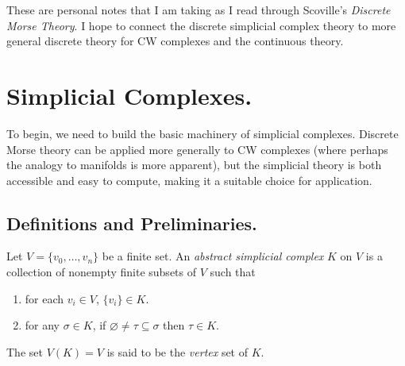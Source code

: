 
\usepackage{csquotes}
\usepackage[style=verbose-ibid,backend=bibtex]{biblatex}


\usepackage{scalerel,stmaryrd}
\newsavebox\wedgearrowbaseline
\savebox\wedgearrowbaseline{$\scalerel{%
    \ooalign{/\cr/}\mkern-8.5mu}{\ssearrow}$}
\newcommand{\wedgearrow}{\mathrel{\scalerel*{%
    \usebox{\wedgearrowbaseline}}{X}}} %

\rhead{\today}



These are personal notes that I am taking as I read through Scoville's \textit{Discrete Morse Theory}\autocite{dmt}.
I hope to connect the discrete simplicial complex theory to more general discrete theory for CW complexes and the
continuous theory.

\section{Simplicial Complexes.}

To begin, we need to build the basic machinery of simplicial complexes. Discrete Morse theory can be applied more generally to CW complexes
(where perhaps the analogy to manifolds is more apparent), but the simplicial theory is both accessible and easy to compute, making it a
suitable choice for application.

\subsection{Definitions and Preliminaries.}

\begin{definition}
    Let $V = \{v_0, \dots, v_n\}$ be a finite set. An \emph{abstract simplicial complex} $K$ on $V$ is a collection of nonempty
    finite subsets of $V$ such that
    \begin{enumerate}
        \item for each $v_i \in V$, $\{v_i\} \in K$.
        \item for any $\sigma \in K$, if $\varnothing \neq \tau \subseteq \sigma$ then $\tau \in K$.
    \end{enumerate}
    The set $V(K) = V$ is said to be the \emph{vertex} set of $K$.
\end{definition}

